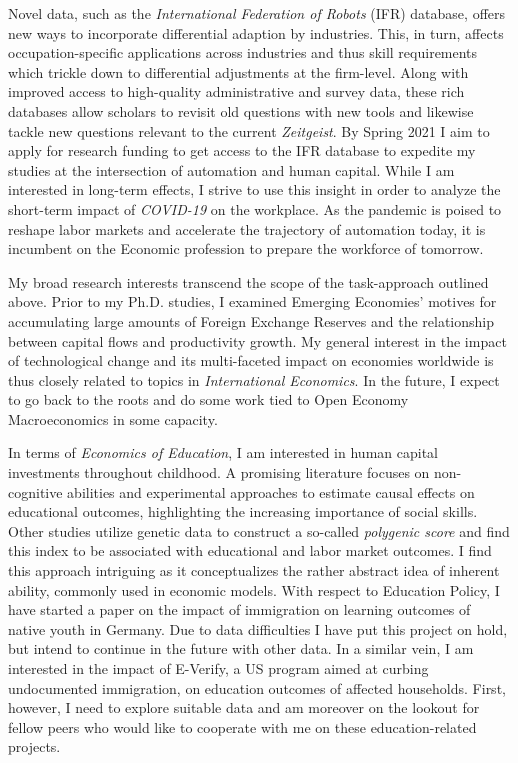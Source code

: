 \documentclass[a4paper,11pt]{article}
\begin{document}
Novel data, such as the \textit{International Federation of Robots} (IFR) database, offers new ways to incorporate differential adaption by industries. This, in turn, affects occupation-specific applications across industries and thus skill requirements which trickle down to differential adjustments at the firm-level. Along with improved access to high-quality administrative and survey data, these rich databases allow  scholars to revisit old questions with new tools and likewise tackle new questions relevant to the current \textit{Zeitgeist}. By Spring 2021 I aim to apply for research funding to get access to the IFR database to expedite my studies at the intersection of automation and human capital. While I am interested in long-term effects, I strive to use this insight in order to analyze the short-term impact of \textit{COVID-19} on the workplace. As the pandemic is poised to reshape labor markets and accelerate the trajectory of automation today, it is incumbent on the Economic profession to prepare the workforce of tomorrow. 

\newpage
My broad research interests transcend the scope of the task-approach outlined above. Prior to my Ph.D. studies, I examined Emerging Economies' motives for accumulating large amounts of Foreign Exchange Reserves and the relationship between capital flows and productivity growth. My general interest in the impact of technological change and its multi-faceted impact on economies worldwide is thus closely related to topics in \textit{International Economics}. In the future, I expect to go back to the roots and do some work tied to Open Economy Macroeconomics in some capacity. 

In terms of \textit{Economics of Education}, I am interested in human capital investments throughout childhood. A promising literature focuses on non-cognitive abilities and experimental approaches to estimate causal effects on educational outcomes, highlighting the increasing importance of social skills. Other studies utilize genetic data to construct a so-called \textit{polygenic score} and find this index to be associated with educational and labor market outcomes. I find this approach intriguing as it conceptualizes the rather abstract idea of inherent ability, commonly used in economic models. With respect to Education Policy, I have started a paper on the impact of immigration on learning outcomes of native youth in Germany. Due to data difficulties I have put this project on hold, but intend to continue in the future with other data. In a similar vein, I am interested in the impact of E-Verify, a US program aimed at curbing undocumented immigration, on education outcomes of affected households. First, however, I need to explore suitable data and am moreover on the lookout for fellow peers who would like to cooperate with me on these education-related projects. 
\end{document}
